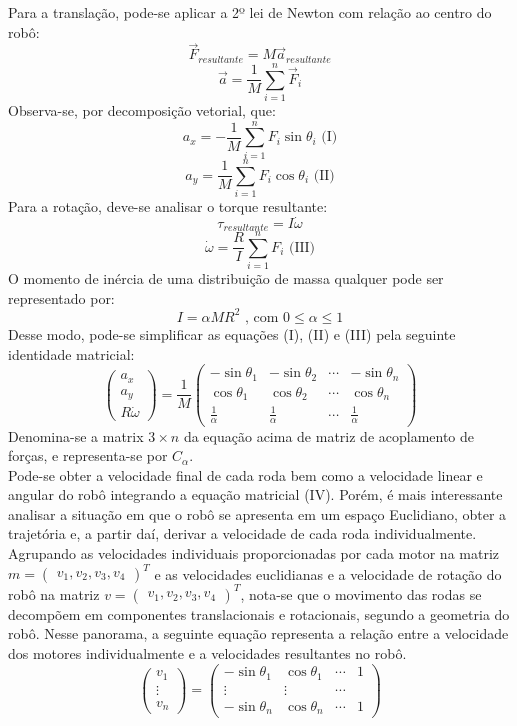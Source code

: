\documentclass{article}
\begin{document}
Para a translação, pode-se aplicar a 2º lei de Newton com relação ao centro do robô:
\[\vec{F}_{resultante} = M\vec{a}_{resultante}\]
\[\vec{a}=\frac{1}{M}\sum_{i=1}^{n}\vec{F}_i\]
Observa-se, por decomposição vetorial, que:
\[a_x=-\frac{1}{M}\sum_{i=1}^{n}F_i\sin\theta_i \text{ (I)}  \]     
\[a_y=\frac{1}{M}\sum_{i=1}^{n}F_i\cos\theta_i \text{ (II)}\]	
Para a rotação, deve-se analisar o torque resultante:
\[\tau_{resultante}=I\dot{\omega}\]
\[\dot{\omega}=\frac{R}{I}\sum_{i=1}^{n}F_i \text{ (III)}\]
O momento de inércia de uma distribuição de massa qualquer pode ser representado por:
\[I=\alpha MR^2\text{ , com } 0\leq\alpha\leq1\]
Desse modo, pode-se simplificar as equações (I), (II) e (III) pela seguinte identidade matricial:
\[
\begin{pmatrix}a_{x}\\a_{y}\\R\dot{\omega} \end{pmatrix}
=\frac{1}{M}
\begin{pmatrix}
  -\sin\theta_1 & -\sin\theta_2 & \cdots & -\sin\theta_n \\
  \cos\theta_1 & \cos\theta_2 & \cdots & \cos\theta_n \\
  \frac{1}{\alpha} & \frac{1}{\alpha} &\cdots & \frac{1}{\alpha}
 \end{pmatrix}
\]
Denomina-se a matrix $3 \times n$ da equação acima de matriz de acoplamento de forças, e representa-se por \( C_\alpha \). \\
Pode-se obter a velocidade final de cada roda bem como a velocidade linear e angular do robô integrando a equação matricial (IV). Porém, é mais interessante analisar a situação em que o robô se apresenta em um espaço Euclidiano, obter a trajetória e, a partir daí, derivar a velocidade de cada roda individualmente.\\
Agrupando as velocidades individuais proporcionadas por cada motor na matriz $m=\begin{pmatrix}v_{1},v_{2},v_{3},v_{4} \end{pmatrix}^T$ e as velocidades euclidianas e a velocidade de rotação do robô na matriz  $v=\begin{pmatrix}v_{1},v_{2},v_{3},v_{4} \end{pmatrix}^T$, nota-se que o movimento das rodas se decompõem em componentes translacionais e rotacionais, segundo a geometria do robô. Nesse panorama, a seguinte equação representa a relação entre a velocidade dos motores individualmente e a velocidades resultantes no robô.
\[
\begin{pmatrix}v_{1}\\ \vdots \\ v_{n} \end{pmatrix}
=
\begin{pmatrix}
  -\sin\theta_1 & \cos\theta_1  & \cdots & 1 \\
  \vdots & \vdots & \cdots  \\
  -\sin\theta_n & \cos\theta_n  &\cdots & 1
 \end{pmatrix}
\]
\end{document}
